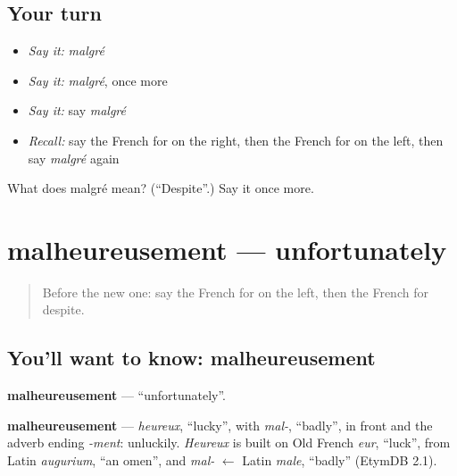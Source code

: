 \subsection*{Your turn}
\begin{itemize}
\raggedright
  \item \emph{Say it:} \emph{malgré}
  \item \emph{Say it:} \emph{malgré}, once more
  \item \emph{Say it:} say \emph{malgré}
  \item \emph{Recall:} say the French for on the right, then the French for on the left, then say \emph{malgré} again
\end{itemize}

\begin{tcolorbox}[breakable,colback=teal!4,colframe=teal!35!black,title={Before you move on}]
What does malgré mean? (\textquotedblleft{}Despite\textquotedblright{}.) Say it once more.
\end{tcolorbox}
\section[malheureusement]{malheureusement — unfortunately}

\label{lesson:FR-C189-malheureusement}



\begin{quote}
Before the new one: say the French for on the left, then the French for despite.
\end{quote}

\subsection*{You'll want to know: malheureusement}
\textbf{malheureusement} — \textquotedblleft{}unfortunately\textquotedblright{}.

\begin{cousinweb}
\textbf{malheureusement} — \emph{heureux}, \textquotedblleft{}lucky\textquotedblright{}, with \emph{mal-}, \textquotedblleft{}badly\textquotedblright{}, in front and the adverb ending \emph{-ment}: unluckily. \emph{Heureux} is built on Old French \emph{eur}, \textquotedblleft{}luck\textquotedblright{}, from Latin \emph{augurium}, \textquotedblleft{}an omen\textquotedblright{}, and \emph{mal-} $\leftarrow$ Latin \emph{male}, \textquotedblleft{}badly\textquotedblright{} (EtymDB 2.1).
\end{cousinweb}

